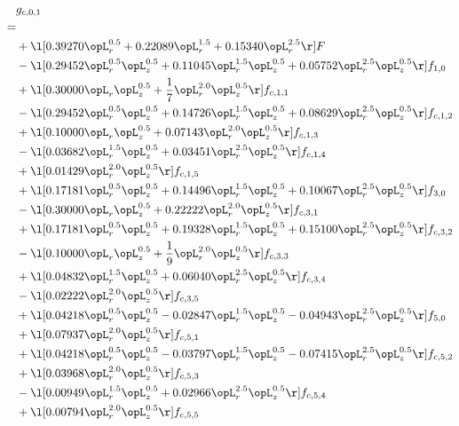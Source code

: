 \begin{alignat}{2} 
\label{eq:g_01_0} 
& g_{c,0,1} \nonumber \\ 
 = \\ 
& + \l[  0.39270 \opL_r^{0.5} +  0.22089 \opL_r^{1.5} +  0.15340 \opL_r^{2.5}  \r] F \nonumber \\ 
& - \l[  0.29452 \opL_r^{0.5} \opL_z^{0.5} +  0.11045 \opL_r^{1.5} \opL_z^{0.5} +  0.05752 \opL_r^{2.5} \opL_z^{0.5}  \r] f_{1,0} \nonumber \\ 
& + \l[  0.30000 \opL_r \opL_z^{0.5} + \frac{1}{7} \opL_r^{2.0} \opL_z^{0.5}  \r] f_{c,1,1} \nonumber \\ 
& - \l[  0.29452 \opL_r^{0.5} \opL_z^{0.5} +  0.14726 \opL_r^{1.5} \opL_z^{0.5} +  0.08629 \opL_r^{2.5} \opL_z^{0.5}  \r] f_{c,1,2} \nonumber \\ 
& + \l[  0.10000 \opL_r \opL_z^{0.5} +  0.07143 \opL_r^{2.0} \opL_z^{0.5}  \r] f_{c,1,3} \nonumber \\ 
& - \l[  0.03682 \opL_r^{1.5} \opL_z^{0.5} +  0.03451 \opL_r^{2.5} \opL_z^{0.5}  \r] f_{c,1,4} \nonumber \\ 
& + \l[  0.01429 \opL_r^{2.0} \opL_z^{0.5}  \r] f_{c,1,5} \nonumber \\ 
& + \l[  0.17181 \opL_r^{0.5} \opL_z^{0.5} +  0.14496 \opL_r^{1.5} \opL_z^{0.5} +  0.10067 \opL_r^{2.5} \opL_z^{0.5}  \r] f_{3,0} \nonumber \\ 
& - \l[  0.30000 \opL_r \opL_z^{0.5} +  0.22222 \opL_r^{2.0} \opL_z^{0.5}  \r] f_{c,3,1} \nonumber \\ 
& + \l[  0.17181 \opL_r^{0.5} \opL_z^{0.5} +  0.19328 \opL_r^{1.5} \opL_z^{0.5} +  0.15100 \opL_r^{2.5} \opL_z^{0.5}  \r] f_{c,3,2} \nonumber \\ 
& - \l[  0.10000 \opL_r \opL_z^{0.5} + \frac{1}{9} \opL_r^{2.0} \opL_z^{0.5}  \r] f_{c,3,3} \nonumber \\ 
& + \l[  0.04832 \opL_r^{1.5} \opL_z^{0.5} +  0.06040 \opL_r^{2.5} \opL_z^{0.5}  \r] f_{c,3,4} \nonumber \\ 
& - \l[  0.02222 \opL_r^{2.0} \opL_z^{0.5}  \r] f_{c,3,5} \nonumber \\ 
& + \l[  0.04218 \opL_r^{0.5} \opL_z^{0.5}   -0.02847 \opL_r^{1.5} \opL_z^{0.5}   -0.04943 \opL_r^{2.5} \opL_z^{0.5}  \r] f_{5,0} \nonumber \\ 
& + \l[  0.07937 \opL_r^{2.0} \opL_z^{0.5}  \r] f_{c,5,1} \nonumber \\ 
& + \l[  0.04218 \opL_r^{0.5} \opL_z^{0.5}   -0.03797 \opL_r^{1.5} \opL_z^{0.5}   -0.07415 \opL_r^{2.5} \opL_z^{0.5}  \r] f_{c,5,2} \nonumber \\ 
& + \l[  0.03968 \opL_r^{2.0} \opL_z^{0.5}  \r] f_{c,5,3} \nonumber \\ 
& - \l[  0.00949 \opL_r^{1.5} \opL_z^{0.5} +  0.02966 \opL_r^{2.5} \opL_z^{0.5}  \r] f_{c,5,4} \nonumber \\ 
& + \l[  0.00794 \opL_r^{2.0} \opL_z^{0.5}  \r] f_{c,5,5} \nonumber \\ 
\end{alignat} 


